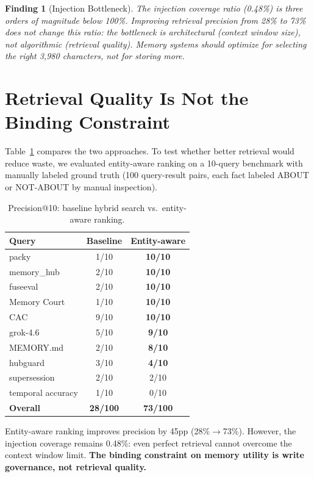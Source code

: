 \documentclass[10pt,twocolumn]{article}
\newtheorem{finding}{Finding}
\begin{document}
\begin{finding}[Injection Bottleneck]
The injection coverage ratio (0.48\%) is three orders of magnitude below 100\%. Improving retrieval precision from 28\% to 73\% does not change this ratio: the bottleneck is architectural (context window size), not algorithmic (retrieval quality). Memory systems should optimize for \emph{selecting the right 3,980 characters}, not for storing more.
\end{finding}

\section{Retrieval Quality Is Not the Binding Constraint}

Table~\ref{tab:retrieval} compares the two approaches. To test whether better retrieval would reduce waste, we evaluated entity-aware ranking on a 10-query benchmark with manually labeled ground truth (100 query-result pairs, each fact labeled ABOUT or NOT-ABOUT by manual inspection).

\begin{table}[h]
\centering
\caption{Precision@10: baseline hybrid search vs.\ entity-aware ranking.}
\label{tab:retrieval}
\begin{tabular}{lcc}
\toprule
Query & Baseline & Entity-aware \\
\midrule
packy & 1/10 & \textbf{10/10} \\
memory\_hub & 2/10 & \textbf{10/10} \\
fuseeval & 2/10 & \textbf{10/10} \\
Memory Court & 1/10 & \textbf{10/10} \\
CAC & 9/10 & \textbf{10/10} \\
grok-4.6 & 5/10 & \textbf{9/10} \\
MEMORY.md & 2/10 & \textbf{8/10} \\
hubguard & 3/10 & \textbf{4/10} \\
supersession & 2/10 & 2/10 \\
temporal accuracy & 1/10 & 0/10 \\
\midrule
\textbf{Overall} & \textbf{28/100} & \textbf{73/100} \\
\bottomrule
\end{tabular}
\end{table}

Entity-aware ranking improves precision by 45pp (28\%$\to$73\%). However, the injection coverage remains 0.48\%: even perfect retrieval cannot overcome the context window limit. \textbf{The binding constraint on memory utility is write governance, not retrieval quality.}
\end{document}
